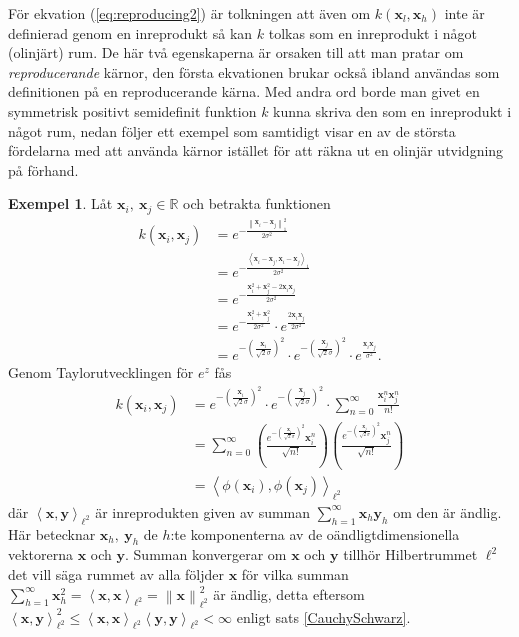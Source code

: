 \documentclass[a4paper, 12pt]{report}
\theoremstyle{definition}
\newtheorem{ex}{Exempel}[section]
\theoremstyle{remark}
\newcommand{\bfx}{\mathbf{x}}
\newcommand{\bfy}{\mathbf{y}}
\newcommand{\llangle}{\left\langle}
\newcommand{\rrangle}{\right\rangle}
\newcommand{\inner}[2]{\llangle #1, #2 \rrangle}
\begin{document}
För ekvation (\ref{eq:reproducing2}) är tolkningen att även om $k\left(\bfx_l, \bfx_h\right)$ inte är definierad genom en inreprodukt så kan $k$ tolkas som en inreprodukt i något (olinjärt) rum. De här två egenskaperna är orsaken till att man pratar om \emph{reproducerande} kärnor, den första ekvationen brukar också ibland användas som definitionen på en reproducerande kärna. Med andra ord borde man givet en symmetrisk positivt semidefinit funktion $k$ kunna skriva den som en inreprodukt i något rum, nedan följer ett exempel som samtidigt visar en av de största fördelarna med att använda kärnor istället för att räkna ut en olinjär utvidgning på förhand.

\begin{ex}
	Låt $\bfx_i,~\bfx_j\in\mathbb{R}$ och betrakta funktionen
	\begin{align*}
		k\left(\bfx_i, \bfx_j\right)&=e^{-\frac{\left\| \bfx_i-\bfx_j\right\|_1^2}{2\sigma^2}}\\&=e^{-\frac{\inner{\bfx_i-\bfx_j}{\bfx_i-\bfx_j}_1}{2\sigma^2}}\\
		&=e^{-\frac{\bfx_i^2+\bfx_j^2-2\bfx_i\bfx_j}{2\sigma^2}}\\&=e^{-\frac{\bfx_i^2+\bfx_j^2}{2\sigma^2}}\cdot e^{\frac{2\bfx_i\bfx_j}{2\sigma^2}}\\
		&= e^{-\left(\frac{\bfx_i}{\sqrt{2}\sigma}\right)^2}\cdot e^{-\left(\frac{\bfx_j}{\sqrt{2}\sigma}\right)^2}\cdot e^{\frac{\bfx_i\bfx_j}{\sigma^2}}.
	\end{align*}
	Genom Taylorutvecklingen för $e^{z}$ fås
	\begin{align*}
		k\left(\bfx_i, \bfx_j\right)&= e^{-\left(\frac{\bfx_i}{\sqrt{2}\sigma}\right)^2}\cdot e^{-\left(\frac{\bfx_j}{\sqrt{2}\sigma}\right)^2}\cdot \sum_{n=0}^{\infty}\frac{\bfx_i^n\bfx_j^n}{n!}\\
		&= \sum_{n=0}^{\infty} \left(\frac{e^{-\left(\frac{\bfx_i}{\sqrt{2}\sigma}\right)^2} \bfx_i^n}{\sqrt{n!}}\right)\left(\frac{e^{-\left(\frac{\bfx_j}{\sqrt{2}\sigma}\right)^2} \bfx_j^n}{\sqrt{n!}}\right)\\
		&= \inner{\phi\left(\bfx_i\right)}{\phi\left(\bfx_j\right)}_{\ell^2}
	\end{align*}
	där $\inner{\bfx}{\bfy}_{\ell^2}$ är inreprodukten given av summan $\sum_{h=1}^{\infty}\bfx_h\bfy_h$ om den är ändlig. Här betecknar $\bfx_h,~\bfy_h$ de $h$:te komponenterna av de oändligtdimensionella vektorerna $\bfx$ och $\bfy$. Summan konvergerar om $\bfx$ och $\bfy$ tillhör Hilbertrummet $\ell^2$ det vill säga rummet av alla följder $\bfx$ för vilka summan $\sum_{h=1}^{\infty}\bfx_h^2=\inner{\bfx}{\bfx}_{\ell^2}=\left\|\bfx\right\|_{\ell^2}^2$ är ändlig, detta eftersom $\inner{\bfx}{\bfy}_{\ell^2}^2\leq\inner{\bfx}{\bfx}_{\ell^2}\inner{\bfy}{\bfy}_{\ell^2}<\infty$ enligt sats \ref{CauchySchwarz}.
	

\end{ex}
\end{document}
